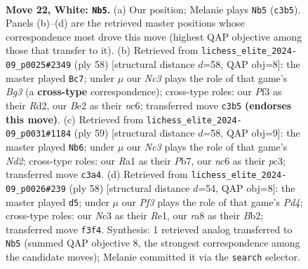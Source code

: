 \documentclass[11pt]{article}
\begin{document}
\begin{figure}[p]
\label{fig:thought-m40}
\end{figure}

\clearpage

\begin{figure}[p]\centering
\begin{subfigure}{0.46\textwidth}\centering
\resizebox{\linewidth}{!}{%
\newchessgame
\chessboard[
  setfen={r1b3k1/p1pp4/1pn4p/5pp1/8/1PN2PP1/P1PPBK1P/R7 w - - 2 22},
  showmover=false,
  pgfstyle=straightmove, color=movearrow, markmove={c3-b5}
]}
\caption{}
\end{subfigure}\hfill
\begin{subfigure}{0.46\textwidth}\centering
\resizebox{\linewidth}{!}{%
\newchessgame
\chessboard[
  setfen={4k3/1p3ppp/1pn2b2/2p5/P1Pp4/1P3PB1/3R2PP/6K1 w - - 0 30},
  showmover=false,
  pgfstyle=straightmove, color=movearrow, markmove={g3-c7}
]}
\caption{}
\end{subfigure}
\\[4pt]
\begin{subfigure}{0.46\textwidth}\centering
\resizebox{\linewidth}{!}{%
\newchessgame
\chessboard[
  setfen={8/1p1nbk2/p4p2/1p1p1Ppp/3P4/2PN2P1/PP2K1P1/2B5 b - - 0 30},
  showmover=false,
  pgfstyle=straightmove, color=movearrow, markmove={d7-b6}
]}
\caption{}
\end{subfigure}\hfill
\begin{subfigure}{0.46\textwidth}\centering
\resizebox{\linewidth}{!}{%
\newchessgame
\chessboard[
  setfen={r7/p2kbp1p/1p1p2p1/n7/3P1P2/2PK2P1/PB1N3P/4R3 w - - 6 30},
  showmover=false,
  pgfstyle=straightmove, color=movearrow, markmove={d4-d5}
]}
\caption{}
\end{subfigure}
\caption{\textbf{Move 22, White: \texttt{Nb5}.} (a) Our position; Melanie plays \texttt{Nb5} (\texttt{c3b5}). Panels (b)--(d) are the retrieved master positions whose correspondence most drove this move (highest QAP objective among those that transfer to it). (b) Retrieved from \texttt{lichess\_elite\_2024-09\_p0025\#2349} (ply 58) [structural distance $d$=58, QAP obj=8]: the master played \texttt{Bc7}; under $\mu$ our \emph{Nc3} plays the role of that game's \emph{Bg3} (a \textbf{cross-type} correspondence); cross-type roles: our \emph{P}f3 as their \emph{R}d2, our \emph{B}e2 as their \emph{n}c6; transferred move \texttt{c3b5} \textbf{(endorses this move)}. (c) Retrieved from \texttt{lichess\_elite\_2024-09\_p0031\#1184} (ply 59) [structural distance $d$=58, QAP obj=9]: the master played \texttt{Nb6}; under $\mu$ our \emph{Nc3} plays the role of that game's \emph{Nd2}; cross-type roles: our \emph{R}a1 as their \emph{P}b7, our \emph{n}c6 as their \emph{p}c3; transferred move \texttt{c3a4}. (d) Retrieved from \texttt{lichess\_elite\_2024-09\_p0026\#239} (ply 58) [structural distance $d$=54, QAP obj=8]: the master played \texttt{d5}; under $\mu$ our \emph{Pf3} plays the role of that game's \emph{Pd4}; cross-type roles: our \emph{N}c3 as their \emph{R}e1, our \emph{r}a8 as their \emph{B}b2; transferred move \texttt{f3f4}. Synthesis: 1 retrieved analog transferred to \texttt{Nb5} (summed QAP objective 8, the strongest correspondence among the candidate moves); Melanie committed it via the \texttt{search} selector.}
\label{fig:thought-m42}
\end{figure}
\end{document}

